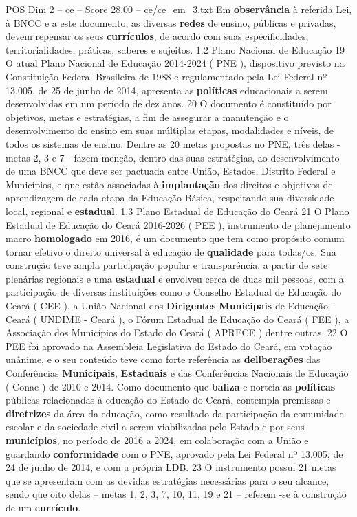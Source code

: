 \begin{textsample}{POS Dim 2 – ce – Score 28.00 – ce/ce\_em\_3.txt}
Em \textbf{observância} à referida Lei, à BNCC e a este documento, as diversas \textbf{redes} de ensino, públicas e privadas, devem repensar os seus \textbf{currículos}, de acordo com suas especificidades, territorialidades, práticas, saberes e sujeitos. 1.2 Plano Nacional de Educação 19 O atual Plano Nacional de Educação 2014-2024 ( PNE ), dispositivo previsto na Constituição Federal Brasileira de 1988 e regulamentado pela Lei Federal nº 13.005, de 25 de junho de 2014, apresenta as \textbf{políticas} educacionais a serem desenvolvidas em um período de dez anos. 20 O documento é constituído por objetivos, metas e estratégias, a fim de assegurar a manutenção e o desenvolvimento do ensino em suas múltiplas etapas, modalidades e níveis, de todos os sistemas de ensino.
Dentre as 20 metas propostas no PNE, três delas - metas 2, 3 e 7 - fazem menção, dentro das suas estratégias, ao desenvolvimento de uma BNCC que deve ser pactuada entre União, Estados, Distrito Federal e Municípios, e que estão associadas à \textbf{implantação} dos direitos e objetivos de aprendizagem de cada etapa da Educação Básica, respeitando sua diversidade local, regional e \textbf{estadual}. 1.3 Plano Estadual de Educação do Ceará 21 O Plano Estadual de Educação do Ceará 2016-2026 ( PEE ), instrumento de planejamento macro \textbf{homologado} em 2016, é um documento que tem como propósito comum tornar efetivo o direito universal à educação de \textbf{qualidade} para todas/os.
Sua construção teve ampla participação popular e transparência, a partir de sete plenárias regionais e uma \textbf{estadual} e envolveu cerca de duas mil pessoas, com a participação de diversas instituições como o Conselho Estadual de Educação do Ceará ( CEE ), a União Nacional dos \textbf{Dirigentes} \textbf{Municipais} de Educação - Ceará ( UNDIME - Ceará ), o Fórum Estadual de Educação do Ceará ( FEE ), a Associação dos Municípios do Estado do Ceará ( APRECE ) dentre outras. 22 O PEE foi aprovado na Assembleia Legislativa do Estado do Ceará, em votação unânime, e o seu conteúdo teve como forte referência as \textbf{deliberações} das Conferências \textbf{Municipais}, \textbf{Estaduais} e das Conferências Nacionais de Educação ( Conae ) de 2010 e 2014.
Como documento que \textbf{baliza} e norteia as \textbf{políticas} públicas relacionadas à educação do Estado do Ceará, contempla premissas e \textbf{diretrizes} da área da educação, como resultado da participação da comunidade escolar e da sociedade civil a serem viabilizadas pelo Estado e por seus \textbf{municípios}, no período de 2016 a 2024, em colaboração com a União e guardando \textbf{conformidade} com o PNE, aprovado pela Lei Federal nº 13.005, de 24 de junho de 2014, e com a própria LDB. 23 O instrumento possui 21 metas que se apresentam com as devidas estratégias necessárias para o seu alcance, sendo que oito delas – metas 1, 2, 3, 7, 10, 11, 19 e 21 – referem -se à construção de um \textbf{currículo}.

\end{textsample}
